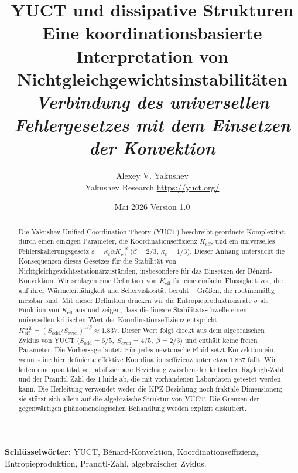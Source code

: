 \documentclass[12pt,a4paper]{article}
\begin{document}
	
	\title{\huge\textbf{YUCT und dissipative Strukturen}\\[0.2cm]
		\Large Eine koordinationsbasierte Interpretation von Nichtgleichgewichtsinstabilitäten\\[0.3cm]
		\large \textit{Verbindung des universellen Fehlergesetzes mit dem Einsetzen der Konvektion}}
	\author{Alexey V. Yakushev\\[0.2cm] \small Yakushev Research \quad \url{https://yuct.org/}}
	\date{\small Mai 2026 \quad Version 1.0}
	\maketitle
	
	\begin{abstract}
		\noindent 
		Die Yakushev Unified Coordination Theory (YUCT) beschreibt geordnete Komplexität durch einen einzigen Parameter, die Koordinationseffizienz \(K_{\mathrm{eff}}\), und ein universelles Fehlerskalierungsgesetz \(\varepsilon = \kappa_c\alpha K_{\mathrm{eff}}^{-\beta}\) (\(\beta = 2/3\), \(\kappa_c = 1/3\)). Dieser Anhang untersucht die Konsequenzen dieses Gesetzes für die Stabilität von Nichtgleichgewichtsstationärzuständen, insbesondere für das Einsetzen der Bénard-Konvektion. Wir schlagen eine Definition von \(K_{\mathrm{eff}}\) für eine einfache Flüssigkeit vor, die auf ihrer Wärmeleitfähigkeit und Scherviskosität beruht – Größen, die routinemäßig messbar sind. Mit dieser Definition drücken wir die Entropieproduktionsrate \(\sigma\) als Funktion von \(K_{\mathrm{eff}}\) aus und zeigen, dass die lineare Stabilitätsschwelle einem universellen kritischen Wert der Koordinationseffizienz entspricht: \(K_{\mathrm{eff}}^{\mathrm{crit}} = (S_{\mathrm{odd}}/S_{\mathrm{even}})^{1/\beta} \approx 1.837\). Dieser Wert folgt direkt aus dem algebraischen Zyklus von YUCT (\(S_{\mathrm{odd}} = 6/5,\; S_{\mathrm{even}} = 4/5,\; \beta = 2/3\)) und enthält keine freien Parameter. Die Vorhersage lautet: Für jedes newtonsche Fluid setzt Konvektion ein, wenn seine hier definierte effektive Koordinationseffizienz unter etwa \(1.837\) fällt. Wir leiten eine quantitative, falsifizierbare Beziehung zwischen der kritischen Rayleigh-Zahl und der Prandtl-Zahl des Fluids ab, die mit vorhandenen Labordaten getestet werden kann. Die Herleitung verwendet weder die KPZ-Beziehung noch fraktale Dimensionen; sie stützt sich allein auf die algebraische Struktur von YUCT. Die Grenzen der gegenwärtigen phänomenologischen Behandlung werden explizit diskutiert.
	\end{abstract}
	\vspace{0.5cm}
	\noindent\textbf{Schlüsselwörter:} YUCT, Bénard-Konvektion, Koordinationseffizienz, Entropieproduktion, Prandtl-Zahl, algebraischer Zyklus.
	
\end{document}
